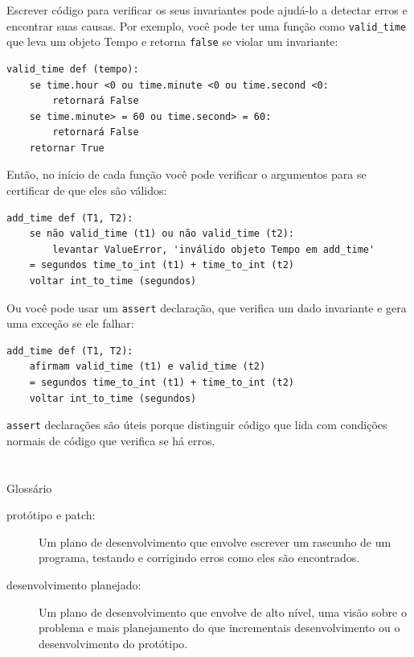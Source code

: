 \documentclass[10pt]{book}
\begin{document}
\begin{v erbatim}
{Escrever código para verificar os seus invariantes pode ajudá-lo a detectar erros
e encontrar suas causas. Por exemplo, você pode ter uma função
como \verb "valid_time" que leva um objeto Tempo e retorna
{\tt false} se violar um invariante:

\begin{verbatim}
valid_time def (tempo):
    se time.hour <0 ou time.minute <0 ou time.second <0:
        retornará False
    se time.minute> = 60 ou time.second> = 60:
        retornará False
    retornar True
\end{verbatim}
%
Então, no início de cada função você pode verificar o
argumentos para se certificar de que eles são válidos:

\begin{verbatim}
add_time def (T1, T2):
    se não valid_time (t1) ou não valid_time (t2):
        levantar ValueError, 'inválido objeto Tempo em add_time'
    = segundos time_to_int (t1) + time_to_int (t2)
    voltar int_to_time (segundos)
\end{verbatim}
%
Ou você pode usar um {\tt assert} declaração, que verifica um dado invariante
e gera uma exceção se ele falhar:

\begin{verbatim}
add_time def (T1, T2):
    afirmam valid_time (t1) e valid_time (t2)
    = segundos time_to_int (t1) + time_to_int (t2)
    voltar int_to_time (segundos)
\end{verbatim}
%
{\tt assert} declarações são úteis porque distinguir
código que lida com condições normais de código
que verifica se há erros.


\section{} Glossário

\begin{description}

\item[protótipo e patch:] Um plano de desenvolvimento que envolve
escrever um rascunho de um programa, testando e corrigindo erros como
eles são encontrados.

\item[desenvolvimento planejado:] Um plano de desenvolvimento que envolve
de alto nível, uma visão sobre o problema e mais planejamento do que incrementais
desenvolvimento ou o desenvolvimento do protótipo.


\end{description}}
\end{v erbatim}
\end{document}
